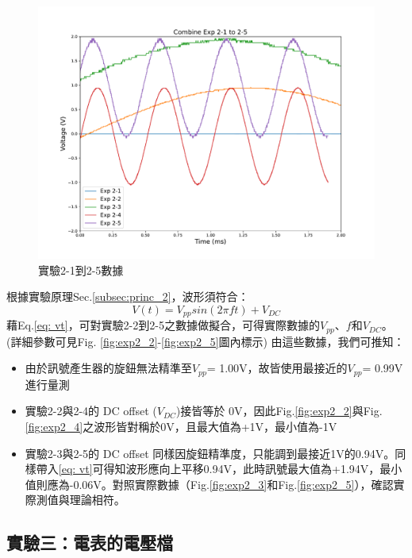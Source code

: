 \documentclass[12pt,a4paper]{article}
\begin{document}
\begin{CJK}{UTF8}{bkai}
\begin{figure}
        \centering
        \includegraphics[width=0.8\linewidth]{figures/exp2/combine.pdf}
        \caption{實驗2-1到2-5數據}
        \label{fig:enter-label}
    \end{figure}
    
    根據實驗原理Sec.\ref{subsec:princ_2}，波形須符合：
    \begin{equation}
    \label{eq: vt}
        V(t) = V_{pp}sin(2\pi ft)+V_{DC}
    \end{equation}
    藉Eq.\ref{eq: vt}，可對實驗2-2到2-5之數據做擬合，可得實際數據的$V_{pp}$、$f$和$V_{DC}$。(詳細參數可見Fig. \ref{fig:exp2_2}-\ref{fig:exp2_5}圖內標示)
    由這些數據，我們可推知：
    \begin{itemize}
        \item 由於訊號產生器的旋鈕無法精準至$V_{pp}$= 1.00V，故皆使用最接近的$V_{pp}$= 0.99V進行量測
        \item 實驗2-2與2-4的 DC offset ($V_{DC}$)接皆等於 0V，因此Fig.\ref{fig:exp2_2}與Fig.\ref{fig:exp2_4}之波形皆對稱於0V，且最大值為+1V，最小值為-1V
        \item 實驗2-3與2-5的 DC offset 同樣因旋鈕精準度，只能調到最接近1V的0.94V。同樣帶入\ref{eq: vt}可得知波形應向上平移0.94V，此時訊號最大值為+1.94V，最小值則應為-0.06V。對照實際數據（Fig.\ref{fig:exp2_3}和Fig.\ref{fig:exp2_5}），確認實際測值與理論相符。
    \end{itemize}

\clearpage
\subsection{實驗三：電表的電壓檔}


\end{CJK}
\end{document}
